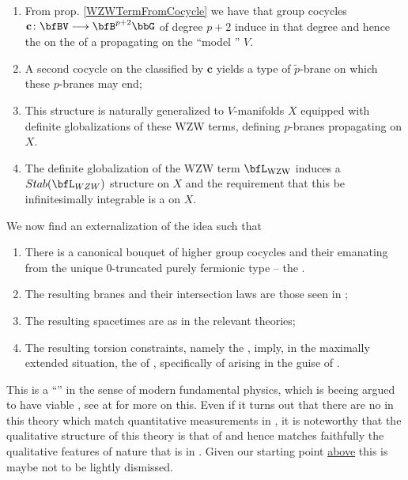 \documentclass[12pt,titlepage]{article}
\theoremstyle{plain}
\theoremstyle{definition}
\theoremstyle{remark}
\begin{document}
\begin{enumerate}%
\item From prop. \ref{WZWTermFromCocycle} we have that group cocycles $\mathbf{c}\colon \bfBV \longrightarrow \bfB^{p+2}\bbG$ of degree $p+2$ induce  in that degree and hence the    on the  of a  propagating on the ``model '' $V$.
\item A second cocycle on the  classified by $\mathbf{c}$ yields a type of $\tilde p$-brane on which these $p$-branes may end;
\item This structure is naturally generalized to $V$-manifolds $X$ equipped with definite globalizations of these WZW terms, defining $p$-branes propagating on $X$.
\item The definite globalization of the WZW term $\bfL_{\mathrm{WZW}}$ induces a $Stab(\bfL_{WZW})$ structure on $X$ and the requirement that this be infinitesimally integrable is a  on $X$.
\end{enumerate}
We now find an externalization of the idea such that
\begin{enumerate}%
\item There is a canonical bouquet of higher group cocycles and their  emanating from the unique 0-truncated purely fermionic type -- the .
\item The resulting branes and their intersection laws are those seen in ;
\item The resulting spacetimes are  as in the relevant  theories;
\item The resulting torsion constraints, namely the , imply, in the maximally extended situation, the   of , specifically of  arising in the guise of .
\end{enumerate}
This is a ``'' in the sense of modern fundamental physics, which is beeing argued to have viable , see at  for more on this. Even if it turns out that there are no  in this theory which match quantitative measurements in , it is noteworthy that the qualitative structure of this theory is that of  and hence matches faithfully the qualitative features of nature that is in . Given our starting point \hyperlink{TheGround}{above} this is maybe not to be lightly dismissed.
\end{document}
